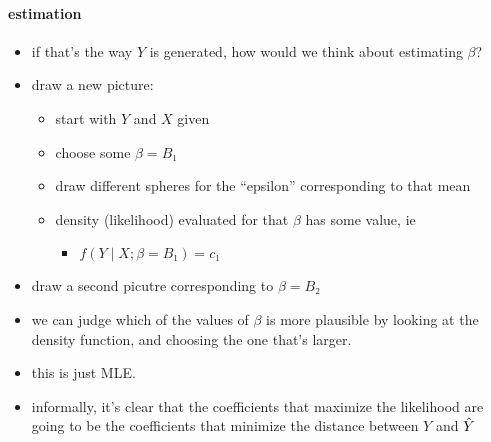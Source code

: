 \paragraph{estimation}
\begin{itemize}
\item if that's the way $Y$ is generated, how would we think about
        estimating $β$?
\item draw a new picture:
\begin{itemize}
\item start with $Y$ and $X$ given
\item choose some $β = B₁$
\item draw different spheres for the ``epsilon'' corresponding to that mean
\item density (likelihood) evaluated for that $β$ has some value, ie
\begin{itemize}
\item $f(Y ∣ X; β = B₁) = c₁$
\end{itemize}
\end{itemize}
\item draw a second picutre corresponding to $β = B₂$
\item we can judge which of the values of $β$ is more plausible by
        looking at the density function, and choosing the one that's larger.
\item this is just MLE.
\item informally, it's clear that the coefficients that maximize the
        likelihood are going to be the coefficients that minimize the
        distance between $Y$ and $\hat{Y}$
\end{itemize}

